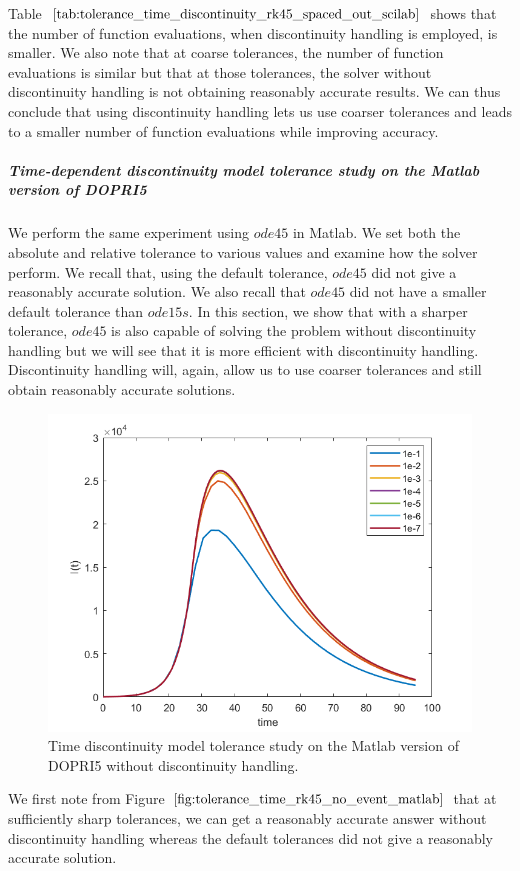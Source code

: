Table $\ref{tab:tolerance_time_discontinuity_rk45_spaced_out_scilab}$ shows that the number of function evaluations, when discontinuity handling is employed, is smaller. We also note that at coarse tolerances, the number of function evaluations is similar but that at those tolerances, the solver without discontinuity handling is not obtaining reasonably accurate results. We can thus conclude that using discontinuity handling lets us use coarser tolerances and leads to a smaller number of function evaluations while improving accuracy.


\subparagraph{Time-dependent discontinuity model tolerance study on the Matlab version of DOPRI5}
We perform the same experiment using $ode45$ in Matlab. We set both the absolute and relative tolerance to various values and examine how the solver perform. We recall that, using the default tolerance, $ode45$ did not give a reasonably accurate solution. We also recall that $ode45$ did not have a smaller default tolerance than $ode15s$. In this section, we show that with a sharper tolerance, $ode45$ is also capable of solving the problem without discontinuity handling but we will see that it is more efficient with discontinuity handling. Discontinuity handling will, again, allow us to use coarser tolerances and still obtain reasonably accurate solutions.

\begin{figure}[H]
\centering
\includegraphics[width=0.7\linewidth]{./figures/tolerance_time_rk45_no_event_matlab}
\caption{Time discontinuity model tolerance study on the Matlab version of DOPRI5 without discontinuity handling.}
\label{fig:tolerance_time_rk45_no_event_matlab}
\end{figure}

We first note from Figure $\ref{fig:tolerance_time_rk45_no_event_matlab}$ that at sufficiently sharp tolerances, we can get a reasonably accurate answer without discontinuity handling whereas the default tolerances did not give a reasonably accurate solution.

